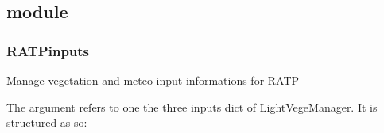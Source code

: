 \documentclass[letterpaper,10pt,english]{sphinxmanual}
\begin{document}
\subsection{ module}
\label{\detokenize{reference:module-RATPinputs}}\label{\detokenize{reference:ratpinputs-module}}

\subsubsection{RATPinputs}
\label{\detokenize{reference:ratpinputs}}
\sphinxAtStartPar
Manage vegetation and meteo input informations for RATP

\sphinxAtStartPar
The argument  refers to one the three inputs dict of LightVegeManager. It is 
structured as so:
\end{document}
